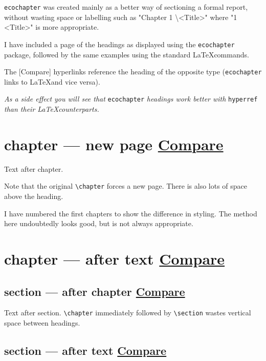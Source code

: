\documentclass[12pt,a4paper,oneside,notitlepage]{report}
\begin{document}
\verb|ecochapter| was created mainly as a better way of sectioning a formal report, without wasting space or labelling such as "Chapter 1 \textbackslash <Title>" where "1 <Title>" is more appropriate.

I have included a page of the headings as displayed using the \verb|ecochapter| package, followed by the same examples using the standard \LaTeX commands.

The [Compare] hyperlinks reference the heading of the opposite type (\verb|ecochapter| links to \LaTeX and vice versa).

\emph{As a side effect you will see that }\verb|ecochapter|\emph{ headings work better with }\verb|hyperref|\emph{ than their \LaTeX counterparts.}

\newpage
\chapter{chapter --- new page \hyperref[echapter]{Compare}}\label{chapter}
Text after chapter. {\color{blue} Note that the original \verb|\chapter| forces a new page. There is also lots of space above the heading.

I have numbered the first chapters to show the difference in styling. The method here undoubtedly looks good, but is not always appropriate.}

\chapter*{chapter --- after text \hyperref[echapterplus]{Compare}}\label{chapterplus}
\section*{section --- after chapter \hyperref[esectionplus]{Compare}}\label{sectionplus}
Text after section. {\color{blue} \verb|\chapter| immediately followed by \verb|\section| wastes vertical space between headings.}

\section*{section --- after text \hyperref[esection]{Compare}}\label{section}
\end{document}
